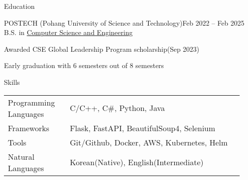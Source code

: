 \documentclass{resume}
\begin{document}
\begin{rSection}{Education}
    \begin{rSubsection}{POSTECH (Pohang University of Science and Technology)}{Feb 2022 -- Feb 2025}
        B.S. in \href{https://cse.postech.ac.kr}{Computer Science and Engineering}

        \item Awarded CSE Global Leadership Program scholarship(Sep 2023)

        \item Early graduation with 6 semesters out of 8 semesters
    \end{rSubsection}
\end{rSection}

\begin{rSection}{Skills}
    \begin{tabular}{@{}p{0.25\linewidth}p{0.7\linewidth}}
        Programming Languages
            & C/C++, C\#, Python, Java \\ [0.3em]

        Frameworks
            & Flask, FastAPI, BeautifulSoup4, Selenium \\ [0.3em]

        Tools
            & Git/Github, Docker, AWS, Kubernetes, Helm \\ [0.3em]

        Natural Languages
            & Korean(Native), English(Intermediate)
    \end{tabular}
\end{rSection}
\end{document}
